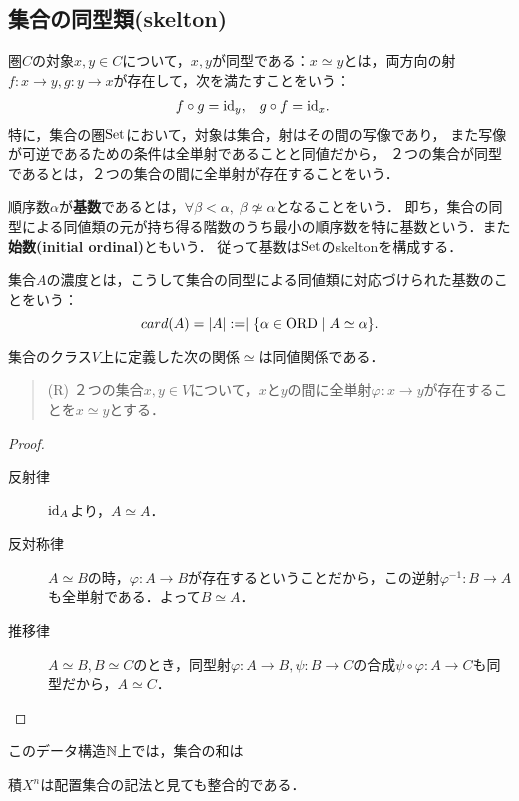 \documentclass[uplatex,dvipdfmx]{jsreport}
\begin{document}
\subsection{集合の同型類(skelton)}

\begin{definition}[isomorphism]
    圏$C$の対象$x,y\in C$について，$x,y$が同型である：$x\simeq y$とは，両方向の射$f:x\to y,g:y\to x$が存在して，次を満たすことをいう：
    \begin{align*}
        f\circ g&=\mathrm{id}_y,&g\circ f&=\mathrm{id}_x.
    \end{align*}
    特に，集合の圏$\mathrm{Set}$において，対象は集合，射はその間の写像であり，
    また写像が可逆であるための条件は全単射であることと同値だから，
    ２つの集合が同型であるとは，２つの集合の間に全単射が存在することをいう．
\end{definition}

\begin{definition}
    順序数$\alpha$が\textbf{基数}であるとは，$\forall\beta<\alpha,\;\beta\not\simeq\alpha$となることをいう．
    即ち，集合の同型による同値類の元が持ち得る階数のうち最小の順序数を特に基数という．また\textbf{始数(initial ordinal)}ともいう．
    従って基数は$\mathrm{Set}$のskeltonを構成する．

    集合$A$の濃度とは，こうして集合の同型による同値類に対応づけられた基数のことをいう：
    \[card(A)=|A|:=\mid\{\alpha\in\mathrm{ORD}\mid A\simeq\alpha\}.\]
\end{definition}

\begin{lemma}[同型は同値関係である]
    集合のクラス$V$上に定義した次の関係$\simeq$は同値関係である．
    \begin{quote}
        (R) ２つの集合$x,y\in V$について，$x$と$y$の間に全単射$\varphi:x\to y$が存在することを$x\simeq y$とする．
    \end{quote}
\end{lemma}
\begin{proof}
    \begin{description}
        \item[反射律] $\mathrm{id}_A$より，$A\simeq A$．
        \item[反対称律] $A\simeq B$の時，$\varphi:A\to B$が存在するということだから，この逆射$\varphi^{-1}:B\to A$も全単射である．よって$B\simeq A$．
        \item[推移律] $A\simeq B,B\simeq C$のとき，同型射$\varphi:A\to B,\psi:B\to C$の合成$\psi\circ\varphi:A\to C$も同型だから，$A\simeq C$．
    \end{description}
\end{proof}
\begin{remark}
    このデータ構造$\mathbb{N}$上では，集合の和は

    積$X^n$は配置集合の記法と見ても整合的である．
\end{remark}
\end{document}
